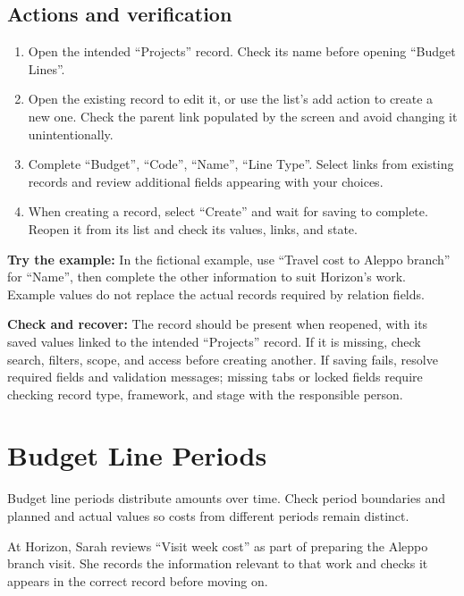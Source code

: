 \subsection{Actions and verification}
\begin{enumerate}
\item Open the intended “Projects” record. Check its name before opening “Budget Lines”.
\item Open the existing record to edit it, or use the list's add action to create a new one. Check the parent link populated by the screen and avoid changing it unintentionally.
\item Complete “Budget”, “Code”, “Name”, “Line Type”. Select links from existing records and review additional fields appearing with your choices.
\item When creating a record, select “Create” and wait for saving to complete. Reopen it from its list and check its values, links, and state.
\end{enumerate}

\textbf{Try the example:} In the fictional example, use “Travel cost to Aleppo branch” for “Name”, then complete the other information to suit Horizon's work. Example values do not replace the actual records required by relation fields.

\textbf{Check and recover:} The record should be present when reopened, with its saved values linked to the intended “Projects” record. If it is missing, check search, filters, scope, and access before creating another. If saving fails, resolve required fields and validation messages; missing tabs or locked fields require checking record type, framework, and stage with the responsible person.

\clearpage
\section{Budget Line Periods}
\label{sec:projects-feature-budget-line-periods}

Budget line periods distribute amounts over time. Check period boundaries and planned and actual values so costs from different periods remain distinct.

\begin{rcnote}
At Horizon, Sarah reviews “Visit week cost” as part of preparing the Aleppo branch visit. She records the information relevant to that work and checks it appears in the correct record before moving on.
\end{rcnote}

